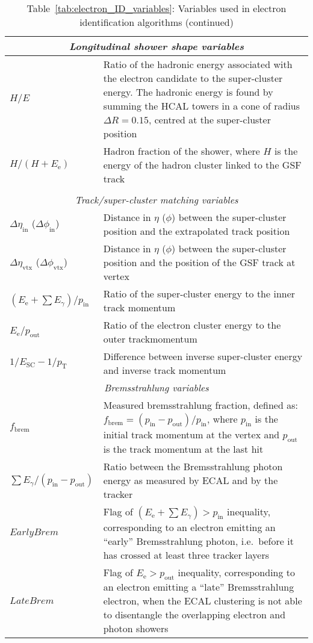\begin{longtable}{@{}p{} p{}@{}}
  \multicolumn{2}{c}{\textit{Longitudinal shower shape variables}} \\
  \midrule
  $H/E$ & Ratio of the hadronic energy associated with the electron candidate to the super-cluster energy. The hadronic energy is found by summing the HCAL towers in a cone of radius $\Delta R = 0.15$, centred at the super-cluster position\\
  $H/(H+E_\text{e})$ & Hadron fraction of the shower, where $H$ is the energy of the hadron cluster linked to
  the GSF track\\
  \midrule
  \newpage
  \caption*{Table~\ref{tab:electron_ID_variables}: Variables used in electron identification algorithms (continued)} \\
  \midrule

  \multicolumn{2}{c}{\textit{Track/super-cluster matching variables}} \\
  \midrule
  $\Delta\eta_{\text{in}}$ ($\Delta\phi_{\text{in}}$) & Distance in $\eta$ ($\phi$) between the super-cluster
  position and the extrapolated track position \\
  $\Delta\eta_{\text{vtx}}$ ($\Delta\phi_{\text{vtx}}$) & Distance in $\eta$ ($\phi$) between the super-cluster
  position and the position of the GSF track at vertex \\
  $(E_\text{e}+\sum E_\gamma)/p_\text{in}$ & Ratio of the super-cluster energy to the inner track\newline
  momentum\\
  $E_\text{e}/p_\text{out}$ & Ratio of the electron cluster energy to the outer track\newline momentum\\
  $1/E_\text{SC} - 1/p_\text{T}$ & Difference between inverse super-cluster energy and inverse
  track momentum\\
  \midrule

  \multicolumn{2}{c}{\textit{Bremsstrahlung variables}} \\
  \midrule
  $f_\text{brem}$ & Measured bremsstrahlung fraction, defined as:
  $f_\text{brem} = (p_\text{in}-p_\text{out})/p_\text{in}$, where $p_\text{in}$ is the initial track momentum at the vertex and $p_\text{out}$ is the track momentum at the last hit\\
  $\sum E_\gamma/(p_\text{in}-p_\text{out})$ & Ratio between the Bremsstrahlung photon energy as measured by
  ECAL and by the tracker\\
  $EarlyBrem$ & Flag of $(E_\text{e}+\sum E_\gamma)>p_\text{in}$ inequality, corresponding to an electron
  emitting an ``early'' Bremsstrahlung photon, i.e.\ before it has crossed at least three tracker layers\\
  $LateBrem$ & Flag of $E_\text{e}>p_\text{out}$ inequality, corresponding to an electron emitting a ``late''
  Bremsstrahlung electron, when the ECAL clustering is not able to disentangle the overlapping electron and photon
  showers\\

  \bottomrule
\end{longtable}
